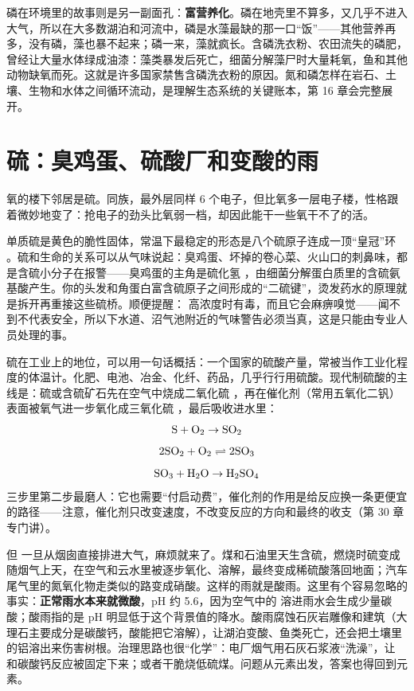 磷在环境里的故事则是另一副面孔：\textbf{富营养化}。磷在地壳里不算多，又几乎不进入大气，所以在大多数湖泊和河流中，磷是水藻最缺的那一口“饭”——其他营养再多，没有磷，藻也暴不起来；磷一来，藻就疯长。含磷洗衣粉、农田流失的磷肥，曾经让大量水体绿成油漆：藻类暴发后死亡，细菌分解藻尸时大量耗氧，鱼和其他动物缺氧而死。这就是许多国家禁售含磷洗衣粉的原因。氮和磷怎样在岩石、土壤、生物和水体之间循环流动，是理解生态系统的关键账本，第 16 章会完整展开。

\section{硫：臭鸡蛋、硫酸厂和变酸的雨}

氧的楼下邻居是硫。同族，最外层同样 6 个电子，但比氧多一层电子楼，性格跟着微妙地变了：抢电子的劲头比氧弱一档，却因此能干一些氧干不了的活。

单质硫是黄色的脆性固体，常温下最稳定的形态是八个硫原子连成一顶“皇冠”环 。硫和生命的关系可以从气味说起：臭鸡蛋、坏掉的卷心菜、火山口的刺鼻味，都是含硫小分子在报警——臭鸡蛋的主角是硫化氢 ，由细菌分解蛋白质里的含硫氨基酸产生。你的头发和角蛋白富含硫原子之间形成的“二硫键”，烫发药水的原理就是拆开再重接这些硫桥。顺便提醒： 高浓度时有毒，而且它会麻痹嗅觉——闻不到不代表安全，所以下水道、沼气池附近的气味警告必须当真，这是只能由专业人员处理的事。

硫在工业上的地位，可以用一句话概括：一个国家的硫酸产量，常被当作工业化程度的体温计。化肥、电池、冶金、化纤、药品，几乎行行用硫酸。现代制硫酸的主线是：硫或含硫矿石先在空气中烧成二氧化硫 ，再在催化剂（常用五氧化二钒）表面被氧气进一步氧化成三氧化硫 ，最后吸收进水里：
\[\mathrm{S} + \mathrm{O_2} \rightarrow \mathrm{SO_2}\]
\[\mathrm{2SO_2} + \mathrm{O_2} \rightleftharpoons \mathrm{2SO_3}\]
\[\mathrm{SO_3} + \mathrm{H_2O} \rightarrow \mathrm{H_2SO_4}\]
三步里第二步最磨人：它也需要“付启动费”，催化剂的作用是给反应换一条更便宜的路径——注意，催化剂只改变速度，不改变反应的方向和最终的收支（第 30 章专门讲）。

但  一旦从烟囱直接排进大气，麻烦就来了。煤和石油里天生含硫，燃烧时硫变成  随烟气上天，在空气和云水里被逐步氧化、溶解，最终变成稀硫酸落回地面；汽车尾气里的氮氧化物走类似的路变成硝酸。这样的雨就是酸雨。这里有个容易忽略的事实：\textbf{正常雨水本来就微酸}，pH 约 5.6，因为空气中的  溶进雨水会生成少量碳酸；酸雨指的是 pH 明显低于这个背景值的降水。酸雨腐蚀石灰岩雕像和建筑（大理石主要成分是碳酸钙，酸能把它溶解），让湖泊变酸、鱼类死亡，还会把土壤里的铝溶出来伤害树根。治理思路也很“化学”：电厂烟气用石灰石浆液“洗澡”，让  和碳酸钙反应被固定下来；或者干脆烧低硫煤。问题从元素出发，答案也得回到元素。

